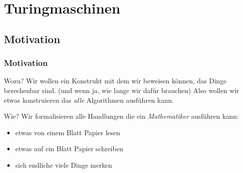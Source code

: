 \section{Turingmaschinen}
\subsection{Motivation}
\begin{frame}
	\frametitle{Motivation}
  \begin{block}{Wozu?}
    Wir wollen ein Konstrukt mit dem wir beweisen können, das Dinge berechenbar sind. (und wenn ja, wie lange wir dafür brauchen)
    Also wollen wir etwas konstruieren das \emph{alle} Algorithmen ausführen kann.
  \end{block}
  \begin{block}{Wie?}
    Wir formalisieren alle Handlungen die ein \emph{Mathematiker} ausführen kann:
    \begin{itemize}
      \item etwas von einem Blatt Papier lesen
      \item etwas auf ein Blatt Papier schreiben
      \item sich endliche viele Dinge merken
    \end{itemize}
  \end{block}
\end{frame}

